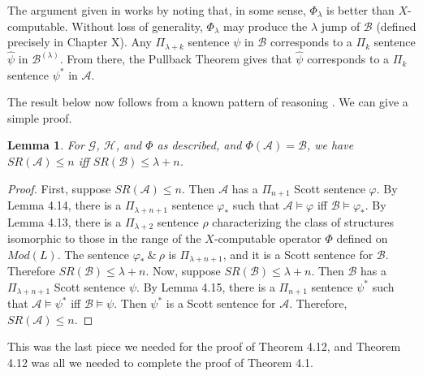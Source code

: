 \documentclass{article}
\newtheorem{lem}[thm]{Lemma}
\begin{document}
The argument given in \cite[Section 5]{CGHT} works by noting that, in some sense, $\Phi_\lambda$ is better than $X$-computable.
Without loss of generality, $\Phi_\lambda$ may produce the $\lambda$ jump of $\mathcal{B}$ (defined precisely in \cite{Mbook2} Chapter X).
Any $\Pi_{\lambda+k}$ sentence $\psi$ in $\mathcal{B}$ corresponds to a $\Pi_k$ sentence $\hat\psi$ in $\mathcal{B}^{(\lambda)}$.
From there, the Pullback Theorem \cite{KMV} gives that $\hat\psi$ corresponds to a $\Pi_k$ sentence $\psi^*$ in $\mathcal{A}$.

\bigskip

The result below now follows from a known pattern of reasoning \cite[Section 6.2]{GHT}.  We can give a simple proof.

\begin{lem}

For $\mathcal{G}$, $\mathcal{H}$, and $\Phi$ as described, and $\Phi(\mathcal{A}) = \mathcal{B}$, we have \linebreak $SR(\mathcal{A}) \leq n$ iff $SR(\mathcal{B}) \leq \lambda+n$. 

\end{lem}

\begin{proof}

First, suppose $SR(\mathcal{A})\leq n$.  Then $\mathcal{A}$ has a $\Pi_{n+1}$ Scott sentence $\varphi$.  By Lemma 4.14, there is a $\Pi_{\lambda+n+1}$ sentence $\varphi_*$ such that $\mathcal{A}\models\varphi$ iff $\mathcal{B}\models\varphi_*$.  By Lemma 4.13, there is a $\Pi_{\lambda+2}$ sentence $\rho$ characterizing the class of structures isomorphic to those in the range of the $X$-computable operator $\Phi$ defined on $Mod(L)$.  The sentence $\varphi_*\ \&\ \rho$ is $\Pi_{\lambda+n+1}$, and it is a Scott sentence for $\mathcal{B}$.  Therefore $SR(\mathcal{B})\leq \lambda+n$.  
Now, suppose $SR(\mathcal{B})\leq\lambda+n$.  Then $\mathcal{B}$ has a $\Pi_{\lambda+n+1}$ Scott sentence $\psi$.  By Lemma 4.15, there is a $\Pi_{n+1}$ sentence $\psi^*$ such that $\mathcal{A}\models\psi^*$ iff $\mathcal{B}\models\psi$.  Then $\psi^*$ is a Scott sentence for $\mathcal{A}$.  Therefore, $SR(\mathcal{A})\leq n$.  
\end{proof}

This was the last piece we needed for the proof of Theorem 4.12, and Theorem 4.12 was all we needed to complete the proof of Theorem 4.1.   
                    
\end{document}
